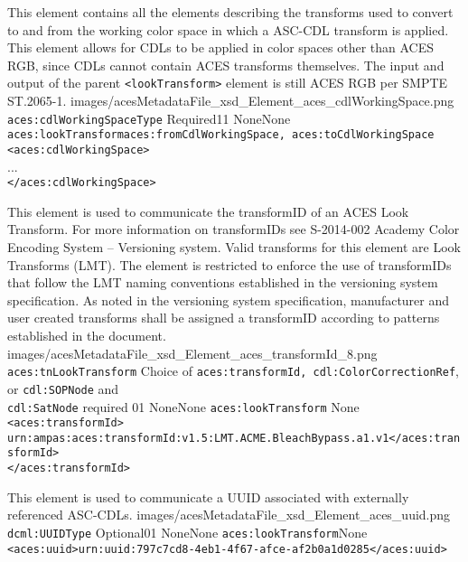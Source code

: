         {This element contains all the elements describing the transforms used to convert to and from the working color space in which a ASC-CDL transform is applied. This element allows for CDLs to be applied in color spaces other than ACES RGB, since CDLs cannot contain ACES transforms themselves. The input and output of the parent \texttt{<lookTransform>} element is still ACES RGB per SMPTE ST.2065-1. }
        {images/acesMetadataFile_xsd_Element_aces_cdlWorkingSpace.png}
        {\texttt{aces:cdlWorkingSpaceType}}
        {Required}{1}{1}
        {None}{None}
        {\texttt{aces:lookTransform}}{\texttt{aces:fromCdlWorkingSpace, aces:toCdlWorkingSpace}}
        {\lstinline{<aces:cdlWorkingSpace>} \\
        ... \\
        \lstinline{</aces:cdlWorkingSpace>}}     
  
        {This element is used to communicate the transformID of an ACES Look Transform.  For more information on transformIDs see S-2014-002 Academy Color Encoding System -- Versioning system.  Valid transforms for this element are Look Transforms (LMT).  The element is restricted to enforce the use of transformIDs that follow the LMT naming conventions established in the versioning system specification.  As noted in the versioning system specification, manufacturer and user created transforms shall be assigned a transformID according to patterns established in the document.}
        {images/acesMetadataFile_xsd_Element_aces_transformId_8.png}
        {\texttt{aces:tnLookTransform}}
        {Choice of \texttt{aces:transformId, cdl:ColorCorrectionRef}, or \texttt{cdl:SOPNode} and \\ \texttt{cdl:SatNode} required}
        {0}{1}
        {None}{None}
        {\texttt{aces:lookTransform}}
        {None}
        {\lstinline{<aces:transformId>}\\
        \lstinline{urn:ampas:aces:transformId:v1.5:LMT.ACME.BleachBypass.a1.v1</aces:transformId>}\\
        \lstinline{</aces:transformId>}
        } 
 
		{This element is used to communicate a UUID associated with externally referenced ASC-CDLs.}
		{images/acesMetadataFile_xsd_Element_aces_uuid.png}
		{\texttt{dcml:UUIDType}}
		{Optional}{0}{1}
		{None}{None}
		{\texttt{aces:lookTransform}}{None}
		{\lstinline{<aces:uuid>urn:uuid:797c7cd8-4eb1-4f67-afce-af2b0a1d0285</aces:uuid>}}    
 
